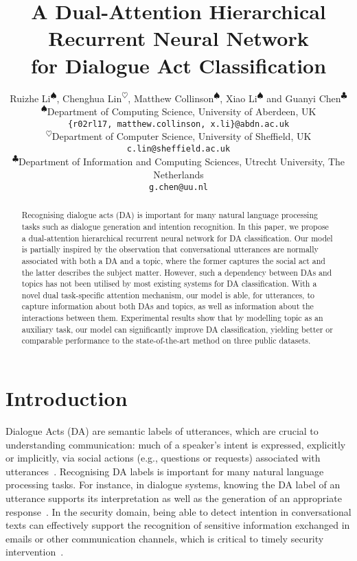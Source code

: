 \documentclass[11pt,a4paper]{article}
\title{A Dual-Attention Hierarchical Recurrent Neural Network\\ for Dialogue Act Classification}
\author{Ruizhe Li\textsuperscript{$\spadesuit$}, Chenghua Lin\textsuperscript{$\heartsuit$}, Matthew Collinson\textsuperscript{$\spadesuit$}, Xiao Li\textsuperscript{$\spadesuit$} and Guanyi Chen\textsuperscript{$\clubsuit$}\\
\textsuperscript{$\spadesuit$}Department of Computing Science, University of Aberdeen, UK\\
\texttt{\{r02rl17, matthew.collinson, x.li\}@abdn.ac.uk}\\
\textsuperscript{$\heartsuit$}Department of Computer Science, University of Sheffield, UK\\
\texttt{c.lin@sheffield.ac.uk}\\
\textsuperscript{$\clubsuit$}Department of Information and Computing Sciences, Utrecht University, The Netherlands \\ 
\texttt{g.chen@uu.nl}}
\date{}
\begin{document}
\maketitle
\begin{abstract}
Recognising dialogue acts (DA) is important for many natural language processing tasks such as dialogue generation and intention recognition. In this paper, we propose a dual-attention hierarchical recurrent neural network for DA classification. Our model is partially inspired by the observation that conversational utterances are normally associated with both a DA and a topic, where the former captures the social act and the latter describes the subject matter. However, such a dependency between DAs and topics has not been utilised by most existing systems for DA classification. With a novel dual task-specific attention mechanism, our model is able, for utterances, to capture information about both DAs and topics, as well as information about the interactions between them. Experimental results show that by modelling topic as an auxiliary task, our model can significantly improve DA classification, yielding better or comparable performance to the state-of-the-art method on three public datasets.

\end{abstract}

\section{Introduction}
Dialogue Acts (DA) are semantic labels of utterances, which are
crucial to understanding communication: much of a speaker's intent is expressed, explicitly or implicitly, via social actions (e.g., questions or requests) associated with utterances~\cite{searle1969speech}.
Recognising DA labels is important for many natural language processing tasks. For instance, in dialogue systems, knowing the DA label of an utterance supports its interpretation as well as the generation of an appropriate response~\cite{searle1969speech,chen2018dialogue}. 
In the security domain, being able to detect intention in conversational texts can effectively support the recognition of sensitive information exchanged in emails or other communication channels, which is critical to timely security intervention~\cite{verma2012detecting}.
\end{document}
